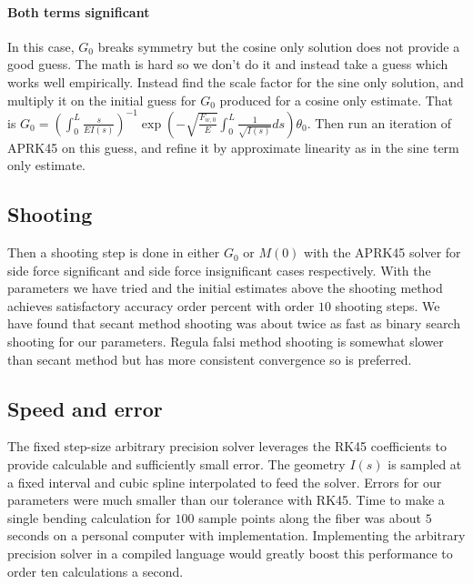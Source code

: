 \documentclass[12pt,reqno]{article}
\begin{document}
	\paragraph{Both terms significant}
	In this case, $G_{0}$ breaks symmetry but the cosine only solution does not provide a good guess. The math is hard so we don't do it and instead take a guess which works well empirically. Instead find the scale factor for the sine only solution, and multiply it on the initial guess for $G_{0}$ produced for a cosine only estimate. That is 
	$
		G_{0} =(\int_{0}^{L}\frac{s}{EI(s)})^{-1} \exp(-{\sqrt{\frac{F_{w,0}}{E}}}\int_{0}^{L}\frac{1}{\sqrt{I(s)}}ds) \theta_{0} 
	$. Then run an iteration of APRK45 on this guess, and refine it by approximate linearity as in the sine term only estimate.

	\subsection{Shooting}
	Then a shooting step is done in either $G_{0}$ or $M(0)$ with the APRK45 solver for side force significant and side force insignificant cases respectively. With the parameters we have tried and the initial estimates above the shooting method achieves satisfactory accuracy order percent with order $10$ shooting steps. We have found that secant method shooting was about twice as fast as binary search shooting for our parameters. Regula falsi method shooting is somewhat slower than secant method but has more consistent convergence so is preferred.
	
	\subsection{Speed and error}
	The fixed step-size arbitrary precision solver leverages the RK45 coefficients to provide calculable and sufficiently small error. The geometry $I(s)$ is sampled at a fixed interval and cubic spline interpolated to feed the solver. Errors for our parameters were much smaller than our tolerance with RK45. Time to make a single bending calculation for $100$ sample points along the fiber was about $5$ seconds on a personal computer with  implementation. Implementing the arbitrary precision solver in a compiled language would greatly boost this performance to order ten calculations a second.
	
\end{document}
